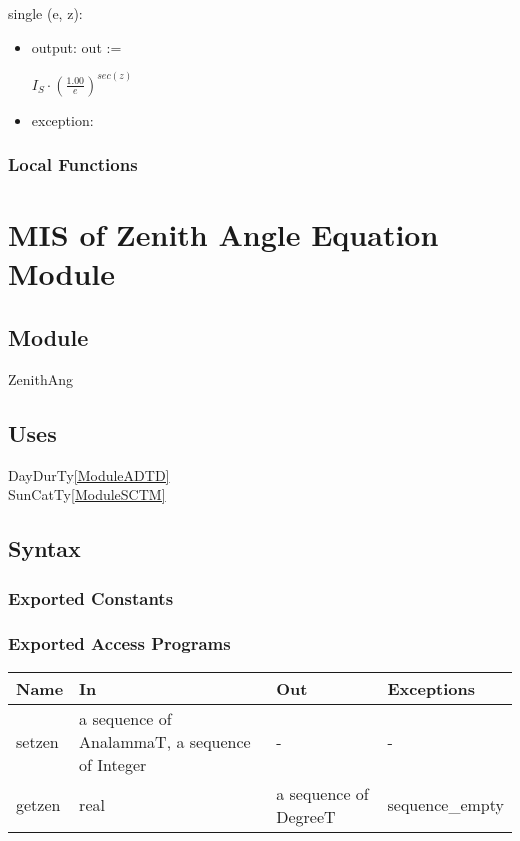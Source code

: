 \documentclass[12pt, titlepage]{article}
\begin{document}
\noindent single (e, z):
\begin{itemize}
\item output: out := 
\begin{center}\large
$I_{S} \cdot (\frac{1.00}{e})^{sec(z)} $
\end{center}
\item exception: 
\end{itemize}

\subsubsection{Local Functions}


\section{MIS of Zenith Angle Equation Module} \label{ModuleZA} 

\subsection{Module}
ZenithAng


\subsection{Uses}
DayDurTy\ref{ModuleADTD}\\
SunCatTy\ref{ModuleSCTM}

\subsection{Syntax}

\subsubsection{Exported Constants}


\subsubsection{Exported Access Programs}

\begin{center}
\begin{tabular}{p{2cm} p{5cm} p{4cm} p{1cm}}
\hline
\textbf{Name} & \textbf{In} & \textbf{Out} & \textbf{Exceptions} \\
\hline 
setzen & a sequence of AnalammaT, a sequence of Integer & -  & -\\
getzen &  real  & a sequence of DegreeT & sequence\_empty \\

\hline
\end{tabular}
\end{center}
\end{document}

